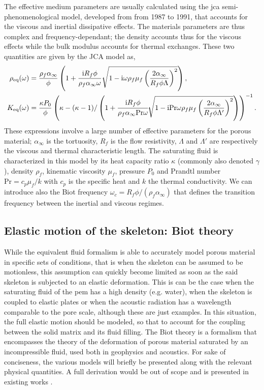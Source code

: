 The effective medium parameters are usually calculated using the \acrfull{jca} semi-phenomenological model\cite{johnson1987,champoux1991}, developed from from 1987 to 1991, that accounts for the viscous and inertial dissipative effects. The materials parameters are thus complex and frequency-dependant; the density accounts thus for the viscous effects while the bulk modulus accounts for thermal exchanges. These two quantities are given by the JCA model as,
\begin{equation}
\begin{aligned}
 \rho_{\text{eq}}(\omega) &= \frac{\rho_{f} \alpha_{\infty}}{\phi}\left(1+\frac{\mathrm i R_f \phi}{\rho_f \alpha_\infty\omega} \sqrt{1- \mathrm i  \omega  \rho_{f} \mu_f \left(\frac{ 2\alpha_{\infty}}{R_f \phi \Lambda}\right)^2 }\right),\\
K_{\text{eq}}(\omega) &=\frac{\kappa P_{0}}{\phi}\left(\kappa-(\kappa-1)/\left(1+ \cfrac{\mathrm i R_f \phi}{\rho_f \alpha_\infty\text{Pr} \omega} \sqrt{1- \mathrm i\text{Pr} \omega \rho_{f} \mu_f\left( \frac{ 2\alpha_{\infty}}{R_f \phi \Lambda^{\prime}}\right)^2 }\right)\right)^{-1}. 
\end{aligned}
\end{equation}
These expressions involve a large number of effective parameters for the porous material; $\alpha_\infty$ is the tortuosity, $R_f$ is the flow resistivity, $\Lambda$ and $\Lambda'$ are respectively the viscous and thermal characteristic length. The saturating fluid is characterized in this model by its heat capacity ratio $\kappa$ (commonly also denoted $\gamma$), density $\rho_f$, kinematic viscosity $\mu_f$, pressure $P_0$ and Prandtl number $\mathrm{Pr} = c_p \mu_f/k$ with $c_p$ is the specific heat and $k$ the thermal conductivity. We can introduce also the Biot frequency $\omega_c = R_f \phi/(\rho_f \alpha_\infty)$ that defines the transition frequency between the inertial and viscous regimes.

    \subsection{Elastic motion of the skeleton: Biot theory}
While the equivalent fluid formalism is able to accurately model porous material in specific sets of conditions, that is when the skeleton can be assumed to be motionless, this assumption can quickly become limited as soon as the said skeleton is subjected to an elastic deformation. This is can be the case when the saturating fluid of the \acrshort{pem} has a high density (e.g. water), when the skeleton is coupled to elastic plates or when the acoustic radiation has a wavelength comparable to the pore scale, although these are just examples. In this situation, the full elastic motion should be modeled, so that to account for the coupling between the solid matrix and its fluid filling. The Biot theory \cite{biot1954,biot1956a,biot1956,biot1956a}is a formalism that encompasses the theory of the deformation of porous material saturated by an incompressible fluid, used both in geophysics and acoustics. For sake of conciseness, the various models will briefly be presented along with the relevant physical quantities. A full derivation would be out of scope and is presented in existing works \cite{allard2009}.

